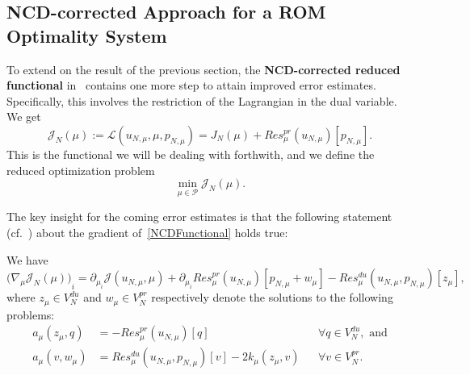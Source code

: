 \subsection{NCD-corrected Approach for a ROM Optimality System}

To extend on the result of the previous section, the \textbf{NCD-corrected reduced functional} in~\cite[Subsection 3.3]{Keil2021} contains one more step to attain improved error estimates.
Specifically, this involves the restriction of the Lagrangian in the dual variable.
We get
\begin{equation}\label{NCDFunctional}
    \mathcal{J}_N(\mu) := \mathcal{L}(u_{N, \mu}, \mu, p_{N, \mu}) = J_N(\mu) + Res_\mu^{pr}(u_{N, \mu})[p_{N, \mu}].
\end{equation}
This is the functional we will be dealing with forthwith, and we define the reduced optimization problem
\begin{equation}\label{ReducProb}
    \min\limits_{\mu \in \mathcal{P}} \mathcal{J}_N(\mu).
\end{equation}

The key insight for the coming error estimates is that the following statement (cf.~\cite[Proposition 3.3]{Keil2021}) about the gradient of~\eqref{NCDFunctional} holds true:
\begin{proposition}\label{NCDGradientProp}
    We have
    \begin{equation*}\label{NCDGradient}
        {\big( \nabla_\mu \mathcal{J}_N(\mu) \big)}_i = \partial_{\mu_i} \mathcal{J}(u_{N, \mu}, \mu) + \partial_{\mu_i} Res_\mu^{pr}(u_{N, \mu})[p_{N, \mu} + w_\mu] - Res_\mu^{du}(u_{N, \mu}, p_{N, \mu})[z_\mu],
    \end{equation*}
    where $z_\mu \in V_N^{du}$ and $w_\mu \in V_N^{pr}$ respectively denote the solutions to the following problems:
    \begin{align*}
        a_\mu(z_\mu, q) &= -Res_\mu^{pr}(u_{N, \mu})[q] &&\forall q \in V_N^{du}, \text{ and} \\
        a_\mu(v, w_\mu) &= Res_\mu^{du}(u_{N, \mu}, p_{N, \mu})[v] - 2 k_\mu(z_\mu, v) &&\forall v \in V_N^{pr}.
    \end{align*}
\end{proposition}

